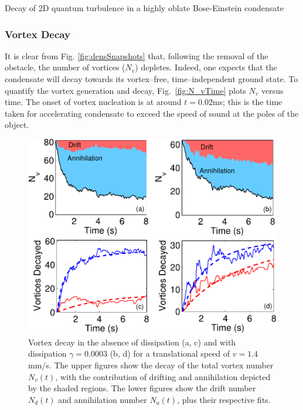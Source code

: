 \begin{chapter}{\label{cha:shin}Decay of 2D quantum turbulence in a highly oblate Bose-Einstein condensate}
\subsubsection{Vortex Decay}
It is clear from Fig. \ref{fig:densSnapshots} that, following the removal 
of the obstacle, the number of vortices ($N_v$) depletes.   
Indeed, one expects that the condensate will decay towards its 
vortex--free, time--independent ground state.  To quantify the vortex generation and
decay, Fig.~\ref{fig:N_vTime} plots $N_v$ versus time. 
The onset of vortex nucleation is at around $t=0.02$ms; 
this is the time taken for accelerating condensate to exceed the speed of 
sound at the poles of the object.
\begin{figure}
\centering
\includegraphics[width=0.9\linewidth]{shin/fig4}
\caption{\label{fig:N_vLong} Vortex decay in the absence of dissipation (a, c) and with dissipation $\gamma=0.0003$ (b, d) for a translational speed of $v=1.4$mm/s.  The upper figures show the decay of the total vortex number $N_v(t)$, with the contribution of drifting and annihilation depicted by the shaded regions.  The lower figures show the drift number $N_d(t)$ and annihilation number $N_a(t)$, plus their respective fits.}
\end{figure}


\end{chapter}
